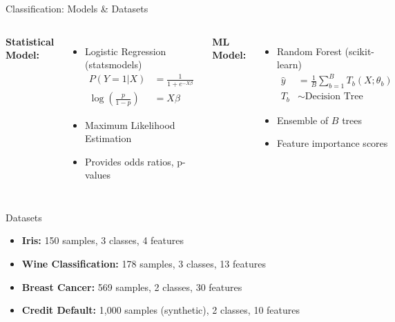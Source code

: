 \documentclass[aspectratio=169,10pt]{beamer}
\begin{document}
\begin{frame}{Classification: Models \& Datasets}
\begin{columns}
\textcolor{statcolor}{\textbf{Statistical Model:}}
\begin{itemize}
    \item Logistic Regression (statsmodels)
    \begin{align*}
    P(Y=1|X) &= \frac{1}{1 + e^{-X\beta}} \\
    \log\left(\frac{p}{1-p}\right) &= X\beta
    \end{align*}
    \item Maximum Likelihood Estimation
    \item Provides odds ratios, p-values
\end{itemize}

\textcolor{mlcolor}{\textbf{ML Model:}}
\begin{itemize}
    \item Random Forest (scikit-learn)
    \begin{align*}
    \hat{y} &= \frac{1}{B}\sum_{b=1}^B T_b(X; \theta_b) \\
    T_b &\sim \text{Decision Tree}
    \end{align*}
    \item Ensemble of $B$ trees
    \item Feature importance scores
\end{itemize}
\end{columns}

\vspace{0.5cm}

\begin{block}{Datasets}
\begin{itemize}
    \item \textbf{Iris:} 150 samples, 3 classes, 4 features
    \item \textbf{Wine Classification:} 178 samples, 3 classes, 13 features
    \item \textbf{Breast Cancer:} 569 samples, 2 classes, 30 features
    \item \textbf{Credit Default:} 1,000 samples (synthetic), 2 classes, 10 features
\end{itemize}
\end{block}
\end{frame}
\end{document}
